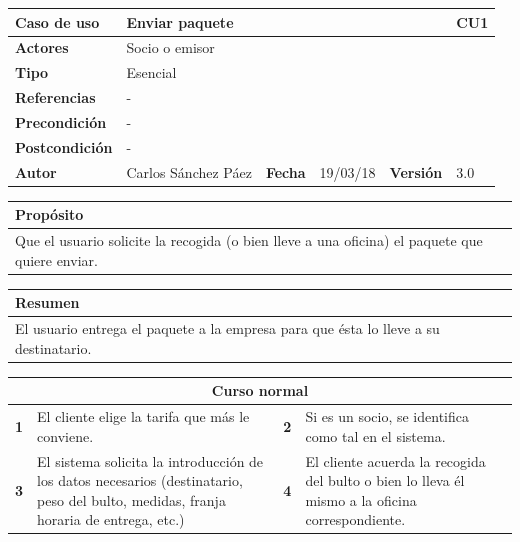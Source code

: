 \documentclass[12pt,spanish]{article}
\begin{document}
\begin{table}[H]
\centering
\begin{tabular}{|m{3cm}|m{4cm}|m{2cm}|m{2cm}|m{2cm}|m{1cm}|}
\hline
\textbf{Caso de uso} &  \multicolumn{4}{m{8cm}|}{Enviar paquete} \vline &  \cellcolor{gray!40}CU1 \\
\hline
\textbf{Actores} & \multicolumn{5}{m{8cm}|}{Socio o emisor} \\
\hline
\textbf{Tipo} & \multicolumn{5}{m{8cm}|}{Esencial} \\
\hline
\textbf{Referencias} &\multicolumn{5}{m{8cm}|}{-} \\
\hline
\textbf{Precondición} & \multicolumn{5}{m{8cm}|}{-} \\
\hline
\textbf{Postcondición} & \multicolumn{5}{m{8cm}|}{-} \\
\hline
\textbf{Autor} & Carlos Sánchez Páez & \textbf{Fecha} & 19/03/18 & \textbf{Versión} & 3.0 \\
\hline
\end{tabular}

\vspace{1cm}

\begin{tabular}{|m{16.2cm}|}
\hline
\textbf{Propósito} \\
\hline
Que el usuario solicite la recogida (o bien lleve a una oficina) el paquete que quiere enviar. \\
\hline
\end{tabular}

\vspace{1cm}

\begin{tabular}{|m{16.2cm}|}
\hline
\textbf{Resumen} \\
\hline
El usuario entrega el paquete a la empresa para que ésta lo lleve a su destinatario. \\
\hline
\end{tabular}

\vspace{1cm}

\begin{tabular}{|m{4pt}|m{7.33cm}|m{4pt}|m{7.33cm}|}
\hline
\multicolumn{4}{|c|}{\textbf{Curso normal}} \\
\hline
\textbf{1} & El cliente elige la tarifa que más le conviene. & \textbf{2} & Si es un socio, se identifica como tal en el sistema. \\
\hline
\textbf{3} & El sistema solicita la introducción de los datos necesarios (destinatario, peso del bulto, medidas, franja horaria de entrega, etc.) & \textbf{4} & El cliente acuerda la recogida del bulto o bien lo lleva él mismo a la oficina correspondiente. \\
\hline
\end{tabular}


\end{table}
\end{document}
